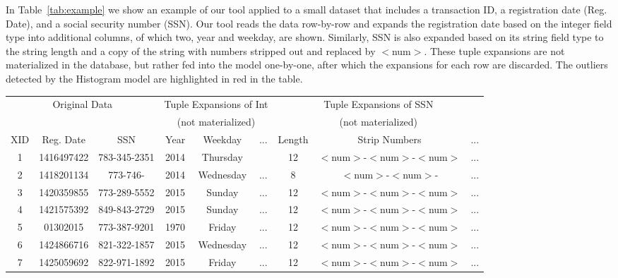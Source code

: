 In Table~\ref{tab:example} we show an example of our tool applied to a small dataset that includes a transaction ID, a registration date (Reg. Date), and a social security number (SSN).
Our tool reads the data row-by-row and expands the registration date based on the integer field type into additional columns, of which two, year and weekday, are shown.
Similarly, SSN is also expanded based on its string field type to the string length and a copy of the string with numbers stripped out and replaced by $<$num$>$.
These tuple expansions are not materialized in the database, but rather fed into the model one-by-one, after which the expansions for each row are discarded.
The outliers detected by the Histogram model are highlighted in red in the table. 

\begin{table*}[t]
\centering
\begin{tabular}{|c|c|c||c|c|c||c|c|c|}
\multicolumn{3}{c}{Original Data} & \multicolumn{3}{c}{Tuple Expansions of Int} & \multicolumn{3}{c}{Tuple Expansions of SSN} \\
\multicolumn{3}{c}{} & \multicolumn{3}{c}{(not materialized)} & \multicolumn{3}{c}{(not materialized)} \\
\hline
XID & Reg. Date & SSN & Year & Weekday & ... & Length & Strip Numbers & ... \\ \hline
1 & 1416497422 & 783-345-2351 & 2014 & Thursday && 12 & $<$num$>$-$<$num$>$-$<$num$>$ &...  \\ \hline 
\rowcolor{red} 
2 & 1418201134 & 773-746- & 2014  & Wednesday &...& 8 & $<$num$>$-$<$num$>$- &...  \\ \hline 
3 & 1420359855 & 773-289-5552 & 2015  & Sunday &...& 12 & $<$num$>$-$<$num$>$-$<$num$>$ &...  \\ \hline 
4 & 1421575392 & 849-843-2729 & 2015 & Sunday &...& 12 & $<$num$>$-$<$num$>$-$<$num$>$ &  ...\\ \hline 
\rowcolor{red} 
5 & 01302015 & 773-387-9201 & 1970 & Friday &...& 12 & $<$num$>$-$<$num$>$-$<$num$>$ &  ...\\ \hline 
6 & 1424866716 & 821-322-1857 & 2015 & Wednesday &...& 12 & $<$num$>$-$<$num$>$-$<$num$>$ &  ...\\ \hline 
7 & 1425059692 & 822-971-1892 & 2015 & Friday &...& 12 & $<$num$>$-$<$num$>$-$<$num$>$ &  ...\\ \hline 
\end{tabular}
\caption{An example dataset showing outliers detected by a histogram model.}
\label{tab:example}
\end{table*}
